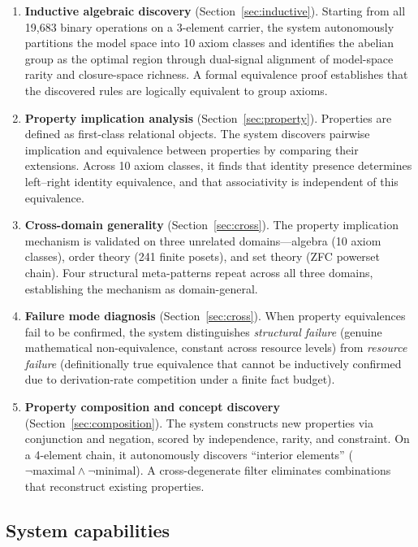 \begin{enumerate}
\item \textbf{Inductive algebraic discovery} (Section~\ref{sec:inductive}). Starting from all 19{,}683 binary operations on a 3-element carrier, the system autonomously partitions the model space into 10 axiom classes and identifies the abelian group as the optimal region through dual-signal alignment of model-space rarity and closure-space richness. A formal equivalence proof establishes that the discovered rules are logically equivalent to group axioms.

\item \textbf{Property implication analysis} (Section~\ref{sec:property}). Properties are defined as first-class relational objects. The system discovers pairwise implication and equivalence between properties by comparing their extensions. Across 10 axiom classes, it finds that identity presence determines left--right identity equivalence, and that associativity is independent of this equivalence.

\item \textbf{Cross-domain generality} (Section~\ref{sec:cross}). The property implication mechanism is validated on three unrelated domains---algebra (10 axiom classes), order theory (241 finite posets), and set theory (ZFC powerset chain). Four structural meta-patterns repeat across all three domains, establishing the mechanism as domain-general.

\item \textbf{Failure mode diagnosis} (Section~\ref{sec:cross}). When property equivalences fail to be confirmed, the system distinguishes \emph{structural failure} (genuine mathematical non-equivalence, constant across resource levels) from \emph{resource failure} (definitionally true equivalence that cannot be inductively confirmed due to derivation-rate competition under a finite fact budget).

\item \textbf{Property composition and concept discovery} (Section~\ref{sec:composition}). The system constructs new properties via conjunction and negation, scored by independence, rarity, and constraint. On a 4-element chain, it autonomously discovers ``interior elements'' ($\lnot\text{maximal} \wedge \lnot\text{minimal}$). A cross-degenerate filter eliminates combinations that reconstruct existing properties.
\end{enumerate}

\subsection{System capabilities}

